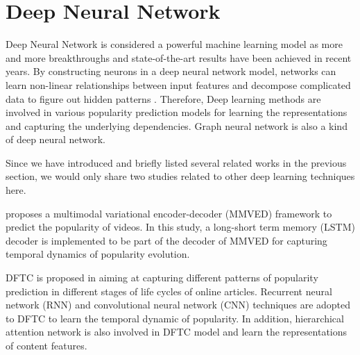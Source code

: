 \section{Deep Neural Network}

Deep Neural Network is considered a powerful machine learning model as more and more breakthroughs and state-of-the-art results have been achieved in recent years. By constructing neurons in a deep neural network model, networks can learn non-linear relationships between input features and decompose complicated data to figure out hidden patterns \cite{DNN_2015}. Therefore, Deep learning methods are involved in various popularity prediction models for learning the representations and capturing the underlying dependencies. Graph neural network is also a kind of deep neural network. 

Since we have introduced and briefly listed several related works in the previous section, we would only share two studies related to other deep learning techniques here.

\cite{inproceedings} proposes a multimodal variational encoder-decoder (MMVED) framework to predict the popularity of videos. In this study, a long-short term memory (LSTM) decoder is implemented to be part of the decoder of MMVED for capturing temporal dynamics of popularity evolution.

DFTC is proposed in \cite{Liao_Xu_Li_Huang_Liu_Li_2019} aiming at capturing different patterns of popularity prediction in different stages of life cycles of online articles. Recurrent neural network (RNN) and convolutional neural network (CNN) techniques are adopted to DFTC to learn the temporal dynamic of popularity. In addition, hierarchical attention network is also involved in DFTC model and learn the representations of content features.

